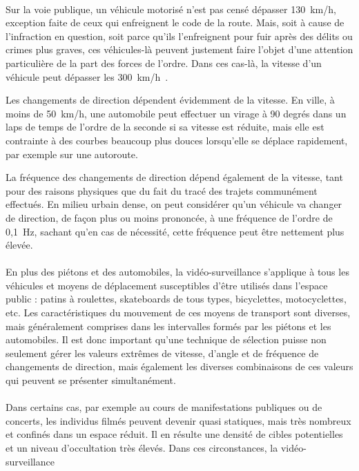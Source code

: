 	\paragraph{}	
	Sur la voie publique, un véhicule motorisé n'est pas censé dépasser 130~km/h, exception faite de ceux qui enfreignent le code de la route. Mais, soit à cause de l'infraction en question, soit parce qu'ils l'enfreignent pour fuir après des délits ou crimes plus graves, ces véhicules-là peuvent justement faire l'objet d'une attention particulière de la part des forces de l'ordre. Dans ces cas-là, la vitesse d'un véhicule peut dépasser les 300~km/h~\cite{speeding}.
	
	Les changements de direction dépendent évidemment de la vitesse. En ville, à moins de 50~km/h, une automobile peut effectuer un virage à 90 degrés dans un laps de temps de l'ordre de la seconde si sa vitesse est réduite, mais elle est contrainte à des courbes beaucoup plus douces lorsqu'elle se déplace rapidement, par exemple sur une autoroute.
	
	La fréquence des changements de direction dépend également de la vitesse, tant pour des raisons physiques que du fait du tracé des trajets communément effectués. En milieu urbain dense, on peut considérer qu'un véhicule va changer de direction, de façon plus ou moins prononcée, à une fréquence de l'ordre de 0,1~Hz, sachant qu'en cas de nécessité, cette fréquence peut être nettement plus élevée.
	
	\paragraph{}
	En plus des piétons et des automobiles, la vidéo-surveillance s'applique à tous les véhicules et moyens de déplacement susceptibles d'être utilisés dans l'espace public : patins à roulettes, skateboards de tous types, bicyclettes, motocyclettes, etc. Les caractéristiques du mouvement de ces moyens de transport sont diverses, mais généralement comprises dans les intervalles formés par les piétons et les automobiles. Il est donc important qu'une technique de sélection puisse non seulement gérer les valeurs extrêmes de vitesse, d'angle et de fréquence de changements de direction, mais également les diverses combinaisons de ces valeurs qui peuvent se présenter simultanément.
	
	\paragraph{}
	Dans certains cas, par exemple au cours de manifestations publiques ou de concerts, les individus filmés peuvent devenir quasi statiques, mais très nombreux et confinés dans un espace réduit. Il en résulte une densité de cibles potentielles et un niveau d'occultation très élevés. Dans ces circonstances, la vidéo-surveillance 
	
